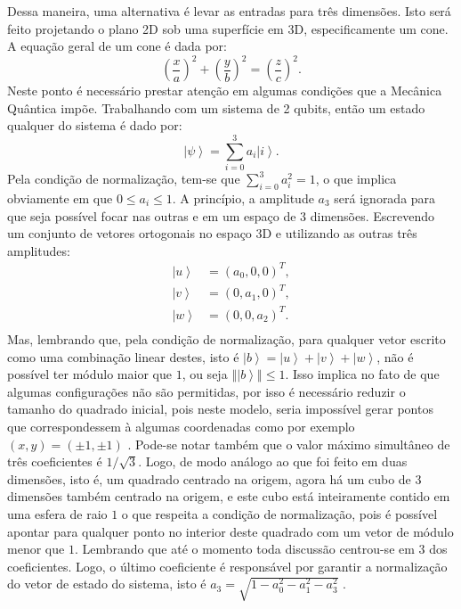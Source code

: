 Dessa maneira, uma alternativa é levar as entradas para três dimensões. Isto será feito projetando o plano 2D sob uma superfície em 3D, especificamente um cone. A equação geral de um cone é dada por:
\begin{equation}
\left(\frac{x}{a}\right)^{2}+\left(\frac{y}{b}\right)^{2}=\left(\frac{z}{c}\right)^{2}
\label{hiperboloide}
. \end{equation}
Neste ponto é necessário prestar atenção em algumas condições que a Mecânica Quântica impõe.  Trabalhando com um sistema de 2 qubits, então um estado qualquer do sistema é dado por:
\begin{equation}
\left|\psi\right\rangle =\sum_{i=0}^{3}a_{i}\left|i\right\rangle 
. \end{equation}Pela condição de normalização, tem-se que $\sum_{i=0}^{3}a_{i}^{2}=1$, o que implica obviamente em que $0\leq a_{i}\leq1$. A princípio, a amplitude $a_3$ será ignorada para que seja possível focar nas outras e em um espaço de 3 dimensões. Escrevendo um conjunto de vetores ortogonais no espaço 3D e utilizando as outras três amplitudes:
\begin{equation}
\begin{split}
\left|u\right\rangle  & =\left(a_{0},0,0\right)^{T}, \\
\left|v\right\rangle & =\left(0,a_{1},0\right)^{T}, \\
\left|w\right\rangle & =\left(0,0,a_{2}\right)^{T}. \\
\end{split}
 \end{equation}
Mas, lembrando que, pela condição de normalização, para qualquer vetor escrito como uma combinação linear destes, isto é $\left|b\right\rangle=\left|u\right\rangle+\left|v\right\rangle+\left|w\right\rangle$, não é possível ter módulo maior que $1$, ou seja $\left\Vert \left|b\right\rangle \right\Vert \leq 1$. Isso implica no fato de que algumas configurações não são permitidas, por isso é necessário reduzir o tamanho do quadrado inicial, pois neste modelo, seria impossível gerar pontos que correspondessem à algumas coordenadas como por exemplo $\left(x,y\right)=\left(\pm1,\pm1\right)$ . Pode-se notar também que o valor máximo simultâneo de três coeficientes é $1/\sqrt{3}$.  Logo, de modo análogo ao que foi feito em duas dimensões, isto é, um quadrado centrado na origem, agora há um cubo de 3 dimensões também centrado na origem, e este cubo está inteiramente contido em uma esfera de raio $1$  o que respeita a condição de normalização, pois é possível apontar para qualquer ponto no interior deste quadrado com um vetor de módulo menor que $1$. Lembrando que até o momento toda discussão centrou-se em $3$ dos coeficientes. Logo, o último coeficiente é responsável por garantir a normalização do vetor de estado do sistema, isto é $a_{3}=\sqrt{1-a_{0}^{2}-a_{1}^{2}-a_{3}^{2}}$ .

